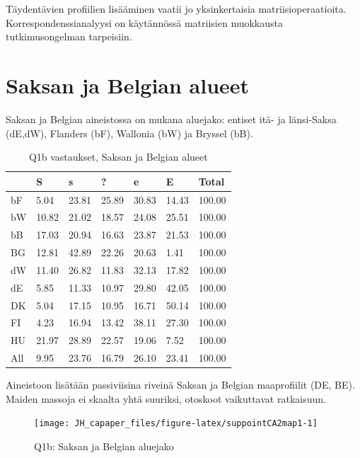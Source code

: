 \documentclass[
  finnish,
]{book}
\begin{document}
Täydentävien profiilien lisääminen vaatii jo yksinkertaisia matriisioperaatioita.
Korrespondenssianalyysi on käytännössä matriisien muokkausta tutkimusongelman
tarpeisiin.

\hypertarget{saksan-ja-belgian-alueet}{%
\section{Saksan ja Belgian alueet}\label{saksan-ja-belgian-alueet}}

Saksan ja Belgian aineistossa on mukana aluejako: entiset itä- ja länsi-Saksa
(dE,dW), Flanders (bF), Wallonia (bW) ja Bryssel (bB).

\begin{table}

\caption{\label{tab:BeDealueTable1}Q1b vastaukset, Saksan ja Belgian alueet}
\centering
\begin{tabular}[t]{lllllll}
\toprule
  & S & s & ? & e & E & Total\\
\midrule
bF & 5.04 & 23.81 & 25.89 & 30.83 & 14.43 & 100.00\\
bW & 10.82 & 21.02 & 18.57 & 24.08 & 25.51 & 100.00\\
bB & 17.03 & 20.94 & 16.63 & 23.87 & 21.53 & 100.00\\
BG & 12.81 & 42.89 & 22.26 & 20.63 & 1.41 & 100.00\\
dW & 11.40 & 26.82 & 11.83 & 32.13 & 17.82 & 100.00\\
\addlinespace
dE & 5.85 & 11.33 & 10.97 & 29.80 & 42.05 & 100.00\\
DK & 5.04 & 17.15 & 10.95 & 16.71 & 50.14 & 100.00\\
FI & 4.23 & 16.94 & 13.42 & 38.11 & 27.30 & 100.00\\
HU & 21.97 & 28.89 & 22.57 & 19.06 & 7.52 & 100.00\\
All & 9.95 & 23.76 & 16.79 & 26.10 & 23.41 & 100.00\\
\bottomrule
\end{tabular}
\end{table}

Aineistoon lisätään passiviisina riveinä Saksan ja Belgian maaprofiilit (DE, BE).
Maiden massoja ei skaalta yhtä suuriksi, otoskoot vaikuttavat ratkaisuun.

\begin{figure}

{\centering \texttt{[image: JH\_capaper\_files/figure-latex/suppointCA2map1-1]} 

}

\caption{Q1b: Saksan ja  Belgian aluejako }\label{fig:suppointCA2map1}
\end{figure}
\end{document}
